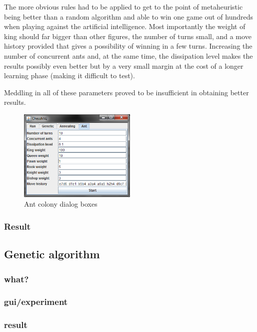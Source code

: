 \documentclass[pdftex]{article}
\begin{document}
The more obvious rules had to be applied to get to the point of metaheuristic being better than a random algorithm and able to win one game out of hundreds when playing against the artificial intelligence. Most importantly the weight of king should far bigger than other figures, the number of turns small, and a move history provided that gives a possibility of winning in a few turns. Increasing the number of concurrent ants and, at the same time, the dissipation level makes the results possibly even better but by a very small margin at the cost of a longer learning phase (making it difficult to test).

Meddling in all of these parameters proved to be insufficient in obtaining better results. 

\begin{figure}[!htb]
	\centering
	\includegraphics[width=0.5\textwidth]{ant/antapplication.png} 
	\caption{Ant colony dialog boxes}
	\label{fig:antapplication}
\end{figure}

\subsubsection{Result}

\subsection{Genetic algorithm}
\label{sec:genetic}

\subsubsection{what?}
\subsubsection{gui/experiment}
\subsubsection{result}
\end{document}
